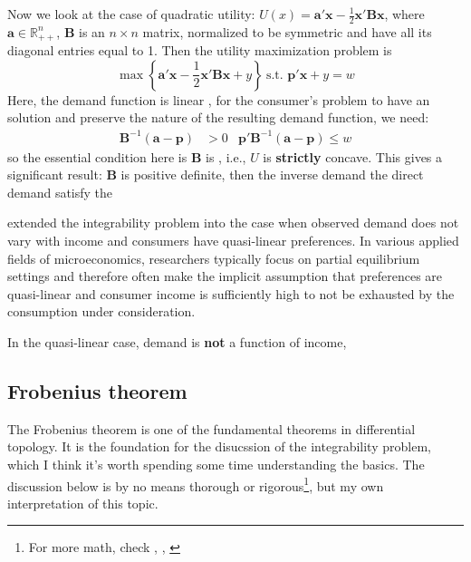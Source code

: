 Now we look at the case of quadratic utility: $U(x)=\mathbf{a}'\mathbf{x}-\frac{1}{2}\mathbf{x}'\mathbf{B}\mathbf{x}$, where $\mathbf{a}\in \mathbb{R}^n_{++}$, $\mathbf{B}$ is an $n\times n$ matrix, normalized to be symmetric and have all its diagonal entries equal to 1. Then the utility maximization problem is
$$
\max \left\{ \mathbf{a}'\mathbf{x}-\frac{1}{2}\mathbf{x}'\mathbf{B}\mathbf{x}+y \right\}\ \text{s.t. }\mathbf{p}'\mathbf{x}+y=w
$$
Here, the demand function is linear , for the consumer's problem to have an  solution and preserve the  nature of the resulting demand function, we need:
\begin{align*}
    \mathbf{B}^{-1}(\mathbf{a}-\mathbf{p})&>0 & \mathbf{p}'\mathbf{B}^{-1}(\mathbf{a}-\mathbf{p})\leq w
\end{align*}
so the essential condition here is $\mathbf{B}$ is , i.e., $U$ is \textbf{strictly} concave. This gives a significant result: $\mathbf{B}$ is positive definite, then the inverse demand the direct demand satisfy the  

\citet*{nocke2017quasi} extended the integrability problem into the case when observed demand does not vary with income and consumers have quasi-linear preferences. In various applied fields of microeconomics, researchers typically focus on partial equilibrium settings and therefore often make the implicit assumption that preferences are quasi-linear and consumer income is sufficiently high to not be exhausted by the consumption under consideration.

In the quasi-linear case, demand is \textbf{not} a function of income, 

\subsection{Frobenius theorem}\label{sssec:frobenius_theorem}
The Frobenius theorem is one of the fundamental theorems in differential topology. It is the foundation for the disucssion of the integrability problem, which I think it's worth spending some time understanding the basics. The discussion below is by no means thorough or rigorous\footnote{For more math, check \cite{sternberg1999lectures}, \cite{warner1983foundations}, \cite{mccleary2013geometry}}, but my own interpretation of this topic.

